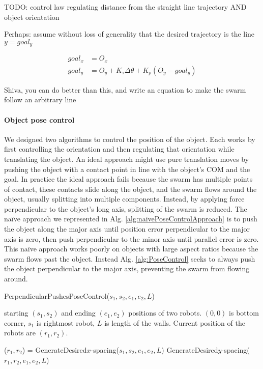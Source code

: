 TODO:  control law regulating distance from the straight line trajectory AND object orientation

Perhaps: assume without loss of generality that the desired trajectory is the line $y = goal_y$

\begin{align} \label{eq:StraightTrajectoryAndOrientation}
goal_x &= O_x \nonumber \\
goal_y &= O_y + K_\tau \Delta\theta  + K_p (O_y -  goal_y)
\end{align}


Shiva, you can do better than this, and write an equation to make the swarm follow an arbitrary line




\paragraph{Object pose control}
We designed two algorithms to control the position of the object.  
Each works by first controlling the orientation and then regulating that orientation while translating the object. 
An ideal approach might use pure translation moves by  pushing  the object with a contact point in line with the object's COM and the goal.
In practice the ideal approach fails because the swarm has multiple points of contact, these contacts slide along the object, and the swarm flows around the object, usually splitting into multiple components.
Instead, by applying force perpendicular to the object's long axis, splitting of the swarm is reduced. 
The na\"{i}ve approach we represented in Alg. \ref{alg:naivePoseControlApproach} is to push the object along the major axis until position error perpendicular to the major axis is zero, then push perpendicular to the minor axis until parallel error is zero. 
This na\"{i}ve approach works poorly on objects with large aspect ratios because the swarm flows past the object. 
Instead Alg. \ref{alg:PoseControl} seeks to always push the object perpendicular to the major axis, preventing the swarm from flowing around. 


\begin{algorithm}
\caption{PerpendicularPushesPoseControl($s_1,s_2,e_1,e_2,L$)}\label{alg:naivePoseControlApproach}
\begin{algorithmic}[1]
\Require starting $(s_1,s_2)$ and ending $(e_1,e_2)$ positions of  two robots. 
$(0,0)$ is bottom corner, $s_1$ is rightmost robot, 
 $L$ is length of the walls. 
 Current position of the robots are $(r_1,r_2)$.

\State ($r_1,r_2$) = GenerateDesired$x$-spacing($s_1,s_2,e_1,e_2,L$)
\State GenerateDesired$y$-spacing($r_1,r_2,e_1,e_2,L$)

\end{algorithmic}
\end{algorithm}



